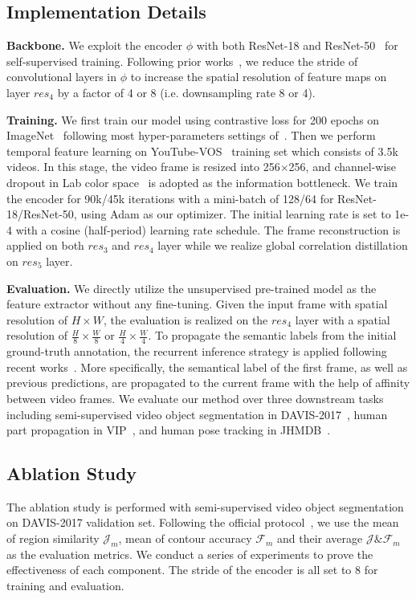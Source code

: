 \documentclass{article}
\begin{document}
\subsection{Implementation Details}
\textbf{Backbone.} We exploit the encoder $\phi$ with both ResNet-18 and ResNet-50~\cite{he2016deep} for self-supervised training. Following prior works~\cite{jabri2020space}\cite{lai2020mast}\cite{xu2021rethinking}, we reduce the stride of convolutional layers in $\phi$ to increase the spatial resolution of feature maps on layer $res_4$  by a factor of 4 or 8 (i.e. downsampling rate 8 or 4).

\textbf{Training.}
We first train our model using contrastive loss for 200 epochs on ImageNet~\cite{deng2009imagenet} following most hyper-parameters settings of~\cite{he2020momentum}. Then we perform temporal feature learning on YouTube-VOS~\cite{xu2018youtube} training set which consists of 3.5k videos. In this stage, the video frame is resized into 256$\times$256, and channel-wise dropout in Lab color space~\cite{lai2019self}\cite{lai2020mast} is adopted as the information bottleneck. We train the encoder for 90k/45k iterations with a mini-batch of 128/64 for ResNet-18/ResNet-50,  using Adam as our optimizer. The initial learning rate is set to 1e-4 with a cosine (half-period) learning rate schedule. The frame reconstruction is applied on both $res_3$ and $res_4$ layer while we realize global correlation distillation on $res_5$ layer. 

\textbf{Evaluation.}
 We directly utilize the unsupervised pre-trained model as the feature extractor without any fine-tuning. Given the input frame with  spatial resolution of $H\times W$, the evaluation is realized on the $res_4$ layer with a spatial resolution of $\frac{H}{8} \times \frac{W}{8}$ or $\frac{H}{4} \times \frac{W}{4}$. To propagate the semantic labels from the initial ground-truth annotation, the recurrent inference strategy is applied following recent works~\cite{jabri2020space}\cite{lai2020mast}\cite{xu2021rethinking}. More specifically,  the semantical label of the first frame, as well as previous predictions, are propagated to the current frame with the help of affinity between video frames. We evaluate our method over three downstream tasks including semi-supervised video object segmentation in DAVIS-2017~\cite{pont20172017}, human part propagation in VIP~\cite{zhou2018adaptive}, and human pose tracking in JHMDB~\cite{jhuang2013towards}.

 \subsection{Ablation Study}
 The ablation study is performed with semi-supervised video object segmentation~\cite{pont20172017} on DAVIS-2017 validation set. Following the official protocol~\cite{pont20172017}, we use the mean of region similarity $\mathcal{J}_m$, mean of contour accuracy $\mathcal{F}_m$ and their average $\mathcal{J} \& \mathcal{F}_m$ as the evaluation metrics. We conduct a series of experiments to prove the effectiveness of each component. The stride of the encoder is all set to 8 for training and evaluation.
 
\end{document}
